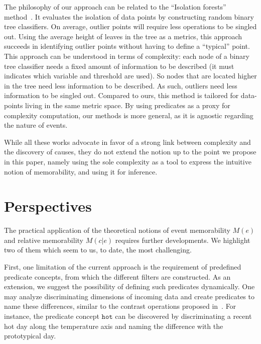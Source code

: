 \documentclass[entropy,article,submit,moreauthors,pdftex]{Definitions/mdpi}
\begin{document}
The philosophy of our approach can be related to the ``Isolation forests'' method~\cite{liu_isolation_2008,hariri_extended_2021}. It evaluates the isolation of data points by constructing random binary tree classifiers. On average, outlier points will require less operations to be singled out. Using the average height of leaves in the tree as a metrics, this approach succeeds in identifying outlier points without having to define a ``typical'' point. This approach can be understood in terms of complexity: each node of a binary tree classifier needs a fixed amount of information to be described (it must indicates which variable and threshold are used). So nodes that are located higher in the tree need less information to be described. As such, outliers need less information to be singled out. Compared to ours, this method is tailored for data-points living in the same metric space. By using predicates as a proxy for complexity computation, our methods is more general, as it is agnostic regarding the nature of events.

While all these works advocate in favor of a strong link between complexity and the
discovery of causes, they do not extend the notion up to the point we propose in this paper, namely using the sole complexity as a tool to express the intuitive notion of memorability, and using it for inference.

\section{Perspectives}
\label{sec:future}

The practical application of the theoretical notions of event memorability $M(e)$ and relative memorability $M(c|e)$ requires further developments. We highlight two of them which seem to us, to date, the most challenging.


First, one limitation of the current approach is the requirement of
predefined predicate concepts, from which the different filters are constructed.
As an extension, we suggest the possibility of defining such predicates dynamically.
One may analyze discriminating
dimensions of incoming data and create predicates to name these differences,
similar to the contrast operations proposed in~\cite{dessalles_conceptual_2015,
    gardenfors2004conceptual}. For instance, the predicate concept $\mathtt{hot}$
can be discovered by discriminating a recent hot day along the
temperature axis and naming the difference with the prototypical day\cite{pol_multi-level_2021}.
\end{document}
